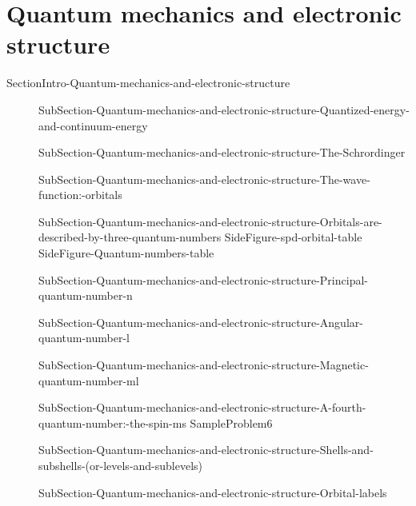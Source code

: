 \documentclass[main.tex]{subfiles}
\begin{document}
\section{Quantum mechanics and electronic structure}{SectionIntro-Quantum-mechanics-and-electronic-structure}
\sloppy
\begin{description}
\item[] {SubSection-Quantum-mechanics-and-electronic-structure-Quantized-energy-and-continuum-energy}
 \item[] {SubSection-Quantum-mechanics-and-electronic-structure-The-Schrordinger}
\item[] {SubSection-Quantum-mechanics-and-electronic-structure-The-wave-function:-orbitals}
\item[] {SubSection-Quantum-mechanics-and-electronic-structure-Orbitals-are-described-by-three-quantum-numbers}
 {SideFigure-spd-orbital-table}
{SideFigure-Quantum-numbers-table}
 \item[]{SubSection-Quantum-mechanics-and-electronic-structure-Principal-quantum-number-n}
 \item[]{SubSection-Quantum-mechanics-and-electronic-structure-Angular-quantum-number-l}

 \item[]{SubSection-Quantum-mechanics-and-electronic-structure-Magnetic-quantum-number-ml}
 \item[] {SubSection-Quantum-mechanics-and-electronic-structure-A-fourth-quantum-number:-the-spin-ms}
  {SampleProblem6}
 
 \item[] {SubSection-Quantum-mechanics-and-electronic-structure-Shells-and-subshells-(or-levels-and-sublevels)}
\item[] {SubSection-Quantum-mechanics-and-electronic-structure-Orbital-labels}
\newpage\vspace{5cm}{Figure-Shell-and-subshell}


\end{description}
\end{document}
